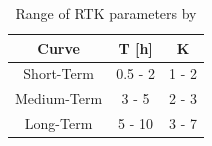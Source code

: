 \begin{table}[h]
\caption{Range of RTK parameters by \citet{Vallabhaneni2007}}
\label{tbl:rtkrange}
\centering
\begin{tabular}{ccc}
\toprule
\textbf{Curve} & \textbf{T {[}h{]}} & \textbf{K} \\ \hline
Short-Term     & 0.5 - 2            & 1 - 2      \\
Medium-Term    & 3 - 5              & 2 - 3      \\
Long-Term      & 5 - 10             & 3 - 7   \\
\bottomrule
\end{tabular}
\end{table}





